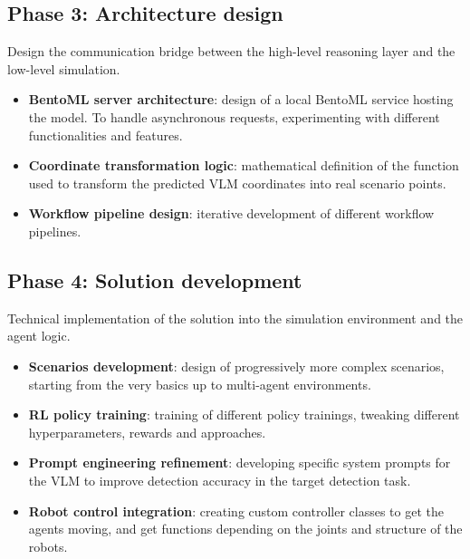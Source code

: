 \subsection*{Phase 3: Architecture design}
Design the communication bridge between the high-level reasoning layer and the low-level simulation.
\begin{itemize}
	\item \textbf{BentoML server architecture}: design of a local BentoML service hosting the model. To handle asynchronous requests, experimenting with different functionalities and features.
	
	\item \textbf{Coordinate transformation logic}: mathematical definition of the function used to transform the predicted VLM coordinates into real scenario points.
	
	\item \textbf{Workflow pipeline design}: iterative development of different workflow pipelines. 
\end{itemize}

\subsection*{Phase 4: Solution development}
Technical implementation of the solution into the simulation environment and the agent logic.
\begin{itemize}
	\item \textbf{Scenarios development}: design of progressively more complex scenarios, starting from the very basics up to multi-agent environments. 
	
	\item \textbf{RL policy training}: training of different policy trainings, tweaking different hyperparameters, rewards and approaches.
	
	\item \textbf{Prompt engineering refinement}: developing specific system prompts for the VLM to improve detection accuracy in the target detection task. 
	
	\item \textbf{Robot control integration}: creating custom controller classes to get the agents moving, and get functions depending on the joints and structure of the robots.
\end{itemize}

